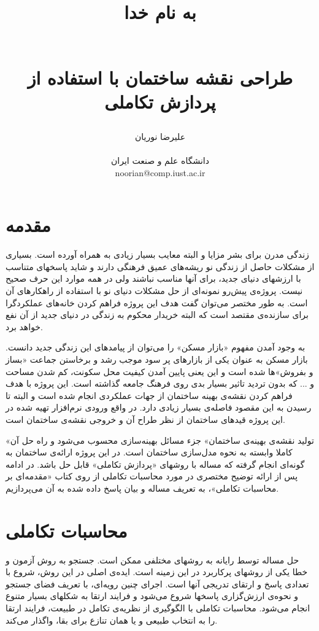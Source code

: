 \documentclass{report}
\title{ 
\begin{normalsize} به نام خدا \end{normalsize}
\\[7cm]
طراحی نقشه ساختمان با استفاده از پردازش تکاملی
\\[3cm]
}
\author{علیرضا نوریان
\\
\\ \small دانشگاه علم و صنعت ایران
\\ \small noorian@comp.iust.ac.ir
}
\begin{document}
\maketitle

\tableofcontents

\begin{abstract}

\end{abstract}

\section{مقدمه}
زندگی مدرن برای بشر مزایا و البته معایب بسیار زیادی به همراه آورده است. بسیاری از مشکلات حاصل از زندگی نو ریشه‌های عمیق فرهنگی دارند و شاید پاسخهای متناسب با ارزشهای دنیای جدید، برای آنها مناسب نباشند ولی در همه موارد این حرف صحیح نیست. پروژه‌ی پیش‌رو نمونه‌ای از حل مشکلات دنیای نو با استفاده از راهکارهای آن است. به طور مختصر می‌توان گفت هدف این پروژه فراهم کردن خانه‌های عملکردگرا برای سازنده‌ی مقتصد است که البته خریدار محکوم به زندگی در دنیای جدید از آن نفع خواهد برد.

به وجود آمدن مفهوم «بازار مسکن» را می‌توان از پیامدهای این زندگی جدید دانست. بازار مسکن به عنوان یکی از بازارهای پر سود موجب رشد و برخاستن جماعت «بساز و بفروش»ها شده است و این یعنی پایین آمدن کیفیت محل سکونت، کم شدن مساحت و ... که بدون تردید تاثیر بسیار بدی روی فرهنگ جامعه گذاشته است. این پروژه با هدف فراهم کردن نقشه‌ی بهینه ساختمان از جهات عملکردی انجام شده است و البته تا رسیدن به این مقصود فاصله‌ی بسیار زیادی دارد. در واقع ورودی نرم‌افزار تهیه شده در این پروژه قیدهای ساختمان از نظر طراح آن و خروجی نقشه‌ی ساختمان است.

«تولید نقشه‌ی بهینه‌ی ساختمان» جزء مسائل بهینه‌سازی محسوب می‌شود و راه حل آن کاملا وابسته به نحوه مدل‌سازی ساختمان است. در این پروژه ارائه‌ی ساختمان به گونه‌ای انجام گرفته که مساله با روشهای «پردازش تکاملی» قابل حل باشد. در ادامه پس از ارائه توضیح مختصری در مورد محاسبات تکاملی از روی کتاب «مقدمه‌ای بر محاسبات تکاملی»\cite{eiben_evolutionary_computing}، به تعریف مساله و بیان پاسخ داده شده به آن می‌پردازیم.

\section{محاسبات تکاملی}
حل مساله توسط رایانه به روشهای مختلفی ممکن است. جستجو به روش آزمون و خطا یکی از روشهای پرکاربرد در این زمینه است. ایده‌ی اصلی در این روش، شروع با تعدادی پاسخ و ارتقای تدریجی آنها است. اجرای چنین رویه‌ای، با تعریف فضای جستجو و نحوه‌ی ارزش‌گزاری پاسخها شروع می‌شود و فرایند ارتقا به شکلهای بسیار متنوع انجام می‌شود. محاسبات تکاملی با الگوگیری از نظریه‌ی تکامل در طبیعت، فرایند ارتقا را به انتخاب طبیعی و یا همان تنازع برای بقا، واگذار می‌کند.
\end{document}
